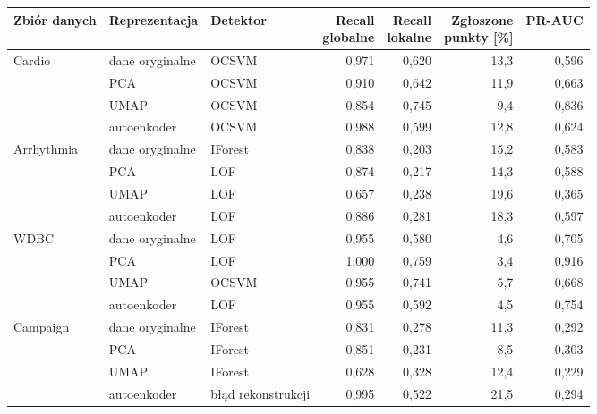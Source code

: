 \begin{tabular}{lllrrrr}
\toprule
Zbiór danych & Reprezentacja & Detektor & \makecell[r]{Recall\\globalne} & \makecell[r]{Recall\\lokalne} & \makecell[r]{Zgłoszone\\punkty [\%]} & PR-AUC \\
\midrule
Cardio & dane oryginalne & OCSVM & 0,971 & 0,620 & 13,3 & 0,596 \\
 & PCA & OCSVM & 0,910 & 0,642 & 11,9 & 0,663 \\
 & UMAP & OCSVM & 0,854 & 0,745 & 9,4 & 0,836 \\
 & autoenkoder & OCSVM & 0,988 & 0,599 & 12,8 & 0,624 \\
Arrhythmia & dane oryginalne & IForest & 0,838 & 0,203 & 15,2 & 0,583 \\
 & PCA & LOF & 0,874 & 0,217 & 14,3 & 0,588 \\
 & UMAP & LOF & 0,657 & 0,238 & 19,6 & 0,365 \\
 & autoenkoder & LOF & 0,886 & 0,281 & 18,3 & 0,597 \\
WDBC & dane oryginalne & LOF & 0,955 & 0,580 & 4,6 & 0,705 \\
 & PCA & LOF & 1,000 & 0,759 & 3,4 & 0,916 \\
 & UMAP & OCSVM & 0,955 & 0,741 & 5,7 & 0,668 \\
 & autoenkoder & LOF & 0,955 & 0,592 & 4,5 & 0,754 \\
Campaign & dane oryginalne & IForest & 0,831 & 0,278 & 11,3 & 0,292 \\
 & PCA & IForest & 0,851 & 0,231 & 8,5 & 0,303 \\
 & UMAP & IForest & 0,628 & 0,328 & 12,4 & 0,229 \\
 & autoenkoder & błąd rekonstrukcji & 0,995 & 0,522 & 21,5 & 0,294 \\
\bottomrule
\end{tabular}
